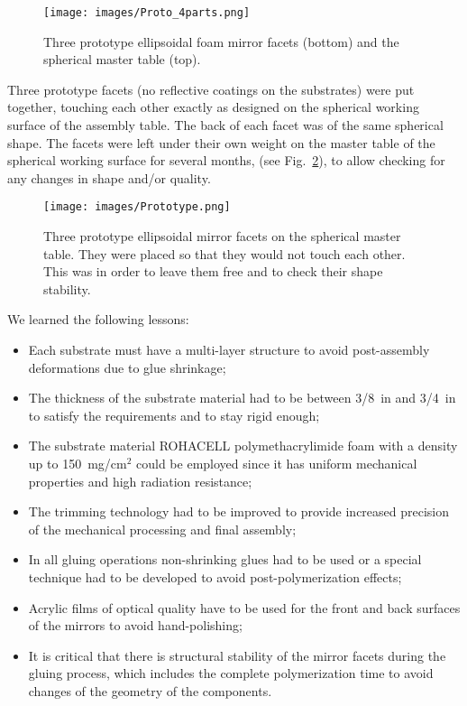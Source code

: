 \begin{figure}[ht]
    \centering
    \texttt{[image: images/Proto\_4parts.png]}
    \caption{Three prototype ellipsoidal foam mirror facets (bottom) and the spherical master table (top).}
    \label{fig:Proto_4parts}
\end{figure}

Three prototype facets (no reflective coatings on the substrates) were put together, touching each other exactly
as designed on the spherical working surface of the assembly table. The back of each facet was of the same
spherical shape. The facets were left under their own weight on the master table of the spherical working surface
for several months, (see Fig.~\ref{fig:Prototype}), to allow checking for any changes in shape and/or quality.

\begin{figure}[ht]
    \centering
    \texttt{[image: images/Prototype.png]}
    \caption{Three prototype ellipsoidal mirror facets on the spherical master table. They were placed so that they
      would not touch each other. This was in order to leave them free and to check their shape stability.}
    \label{fig:Prototype}
\end{figure}
We learned the following lessons:

\begin{itemize}
\item Each substrate must have a multi-layer structure to avoid post-assembly deformations due to glue
  shrinkage;
\item The thickness of the substrate material had to be between 3/8~in and 3/4~in to satisfy the requirements
  and to stay rigid enough;
\item The substrate material ROHACELL polymethacrylimide foam with a density up to 150~mg/cm$^2$
  could be employed since it has uniform mechanical properties and high radiation resistance;
\item The trimming technology had to be improved to provide increased precision of the mechanical
  processing and final assembly;
\item In all gluing operations non-shrinking glues had to be used or a special technique had to be developed to
  avoid post-polymerization effects;
\item Acrylic films of optical quality have to be used for the front and back surfaces of the mirrors to avoid
  hand-polishing;
\item It is critical that there is structural stability of the mirror facets during the gluing process, which
  includes the complete polymerization time to avoid changes of the geometry of the components.
\end{itemize}

